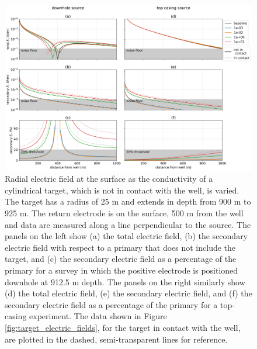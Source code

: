 \begin{figure}
    \begin{center}
    \includegraphics[width=\textwidth]{figures/offset_electric_fields.png}
    \end{center}
\caption{
    Radial electric field at the surface as the conductivity of a cylindrical target, which is not in contact with the well,
    is varied. The target has a radius of 25 m and extends in depth from 900 m to 925 m. The return electrode
    is on the surface, 500 m from the well and data are measured along a line perpendicular to the source.
    The panels on the left show
    (a) the total electric field, (b) the secondary electric field with respect to a primary that does not include the target,
    and (c) the secondary electric field as a percentage of the primary for a survey in which the positive electrode is
    positioned downhole at 912.5 m depth. The panels on the right similarly show (d) the total electric field, (e) the
    secondary electric field, and (f) the secondary electric field as a percentage of the primary for a top-casing experiment.
    The data shown in Figure \ref{fig:target_electric_fields}, for the target in contact with the well,
    are plotted in the dashed, semi-transparent lines for reference.
}
\label{fig:offset_electric_fields}
\end{figure}
